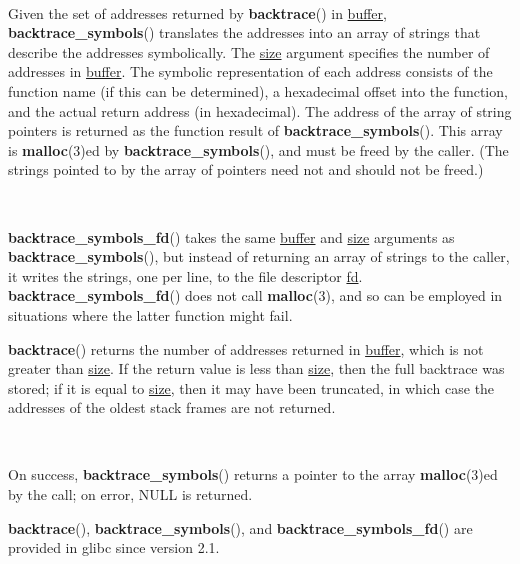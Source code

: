 \documentclass[]{article}
\let\realtextbf=\textbf
\renewcommand{\textbf}[1]{\textcolor{boldcolor}{\realtextbf{#1}}}
\renewcommand{\emph}[1]{\underline{#1}}
\begin{document}
~

Given the set of addresses returned by \textbf{backtrace}() in
\emph{buffer}, \textbf{backtrace\_symbols}() translates the addresses
into an array of strings that describe the addresses symbolically. The
\emph{size} argument specifies the number of addresses in \emph{buffer}.
The symbolic representation of each address consists of the function
name (if this can be determined), a hexadecimal offset into the
function, and the actual return address (in hexadecimal). The address of
the array of string pointers is returned as the function result of
\textbf{backtrace\_symbols}(). This array is \textbf{malloc}(3)ed by
\textbf{backtrace\_symbols}(), and must be freed by the caller. (The
strings pointed to by the array of pointers need not and should not be
freed.)

~

\textbf{backtrace\_symbols\_fd}() takes the same \emph{buffer} and
\emph{size} arguments as \textbf{backtrace\_symbols}(), but instead of
returning an array of strings to the caller, it writes the strings, one
per line, to the file descriptor \emph{fd}.
\textbf{backtrace\_symbols\_fd}() does not call \textbf{malloc}(3), and
so can be employed in situations where the latter function might fail.


\textbf{backtrace}() returns the number of addresses returned in
\emph{buffer}, which is not greater than \emph{size}. If the return
value is less than \emph{size}, then the full backtrace was stored; if
it is equal to \emph{size}, then it may have been truncated, in which
case the addresses of the oldest stack frames are not returned.

~

On success, \textbf{backtrace\_symbols}() returns a pointer to the array
\textbf{malloc}(3)ed by the call; on error, NULL is returned.


\textbf{backtrace}(), \textbf{backtrace\_symbols}(), and
\textbf{backtrace\_symbols\_fd}() are provided in glibc since version
2.1.
\end{document}
